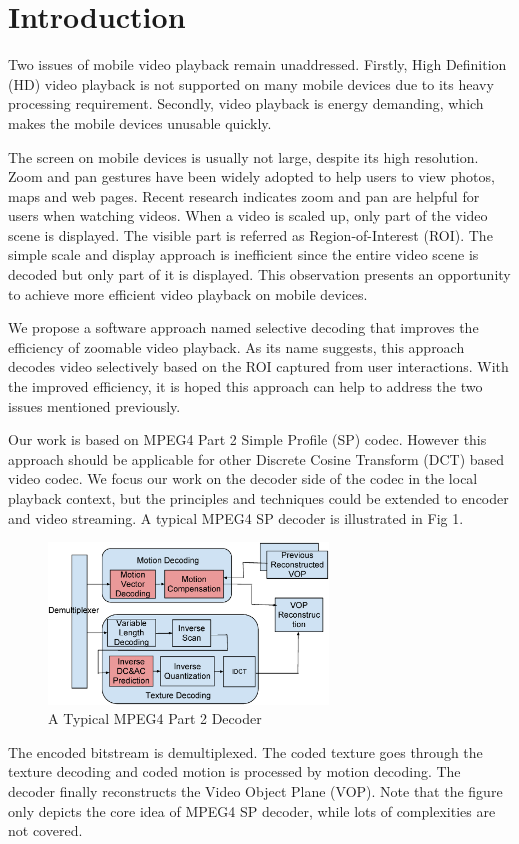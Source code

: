 \section{Introduction}
Two issues of mobile video playback remain unaddressed. Firstly, High Definition (HD) video playback is not supported on many mobile devices due to its heavy processing requirement. Secondly, video playback is energy demanding, which makes the mobile devices unusable quickly. 

The screen on mobile devices is usually not large, despite its high resolution. Zoom and pan gestures have been widely adopted to help users to view photos, maps and web pages. Recent research indicates zoom and pan are helpful for users when watching videos\cite{Khiem:2011:TUU:2072298.2071917}. When a video is scaled up, only part of the video scene is displayed. The visible part is referred as Region-of-Interest (ROI). The simple scale and display approach is inefficient since the entire video scene is decoded but only part of it is displayed. This observation presents an opportunity to achieve more efficient video playback on mobile devices. 

We propose a software approach named selective decoding that improves the efficiency of zoomable video playback. As its name suggests, this approach decodes video selectively based on the ROI captured from user interactions. With the improved efficiency, it is hoped this approach can help to address the two issues mentioned previously.

Our work is based on MPEG4 Part 2 Simple Profile (SP) codec. However this approach should be applicable for other Discrete Cosine Transform (DCT) based video codec. We focus our work on the decoder side of the codec in the local playback context, but the principles and techniques could be extended to encoder and video streaming. A typical MPEG4 SP decoder is illustrated in Fig 1.
 
\begin{figure}
\centering
\includegraphics[height=4.3cm]{decoderb.eps}
\caption{A Typical MPEG4 Part 2 Decoder}
\end{figure}
The encoded bitstream is demultiplexed. The coded texture goes through the texture decoding and coded motion is processed by motion decoding. The decoder finally reconstructs the Video Object Plane (VOP). Note that the figure only depicts the core idea of MPEG4 SP decoder, while lots of complexities are not covered. 

